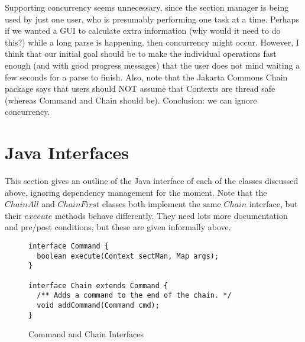 \documentclass{llncs} %
\begin{document}
\begin{description}
  Supporting concurrency seems unnecessary, since the section manager is
  being used by just one user, who is presumably performing one task at a
  time.  Perhaps if we wanted a GUI to calculate extra information (why
  would it need to do this?) while a long parse is happening, then
  concurrency might occur.  However, I think that our initial goal should
  be to make the individual operations fast enough (and with good progress
  messages) that the user does not mind waiting a few seconds for a parse
  to finish.  Also, note that the Jakarta Commons Chain package says
  that users should NOT assume that Contexts are thread safe (whereas
  Command and Chain should be).  Conclusion: we can ignore concurrency.
\end{description}


\section{Java Interfaces}

This section gives an outline of the Java interface of each of the classes
discussed above, ignoring dependency management for the moment.
Note that the $ChainAll$ and $ChainFirst$ classes both implement the
same $Chain$ interface, but their $execute$ methods behave differently.
They need lots more documentation and pre/post conditions, but these are
given informally above. 

\begin{figure}[htbp]
  \centering
\begin{small}
\begin{verbatim}
interface Command {
  boolean execute(Context sectMan, Map args);
}

interface Chain extends Command {
  /** Adds a command to the end of the chain. */
  void addCommand(Command cmd);
}
\end{verbatim}
\end{small}
  \caption{Command and Chain Interfaces}
  \label{fig:command}
\end{figure}
\end{document}
